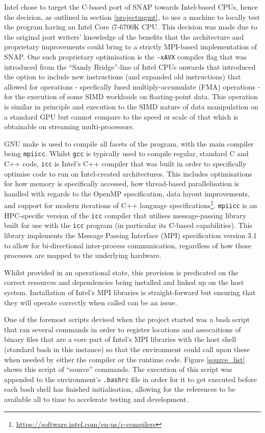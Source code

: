 \documentclass[conference]{IEEEtran}
\begin{document}
Intel chose to target the C-based port of SNAP towards Intel-based CPUs, hence the decision, as outlined in section \ref{projectmgmt}, to use a machine to locally test the program having an Intel Core i7-6700K CPU. This decision was made due to the original port writers' knowledge of the benefits that the architecture and proprietary improvements could bring to a strictly MPI-based implementation of SNAP. One such proprietary optimisation is the \texttt{-xAVX} compiler flag that was introduced from the ``Sandy Bridge''-line of Intel CPUs onwards that introduced the option to include new instructions (and expanded old instructions) that allowed for operations - specfically fused multiply-accumulate (FMA) operations - for the execution of some SIMD workloads on floating-point data\cite{KanterIntel}. This operation is similar in principle and execution to the SIMD nature of data manipulation on a standard GPU but cannot compare to the speed or scale of that which is obtainable on streaming multi-processors.

GNU make is used to compile all facets of the program, with the main compiler being \texttt{mpiicc}. Whilst \texttt{gcc} is typically used to compile regular, standard C and C++ code, \texttt{icc} is Intel's C++ compiler that was built in order to specifically optimise code to run on Intel-created architectures. This includes optimisations for how memory is specifically accessed, how thread-based parallelisation is handled with regards to the OpenMP specification, data layout improvements, and support for modern iterations of C++ language specifications\footnote{\url{https://software.intel.com/en-us/c-compilers}}. \texttt{mpiicc} is an HPC-specific version of the \texttt{icc} compiler that utilises message-passing library built for use with the \texttt{icc} program (in particular its C-based capabilities). This library implements the Message Passing Interface (MPI) specification version 3.1\cite{intel-mpi-ref} to allow for bi-directional inter-process communication, regardless of how those processes are mapped to the underlying hardware.

Whilst provided in an operational state, this provision is predicated on the correct resources and dependencies being installed and linked up on the host system. Installation of Intel's MPI libraries is straight-forward but ensuring that they will operate correctly when called can be an issue.

One of the foremost scripts devised when the project started was a bash script that ran several commands in order to register locations and assocaitions of binary files that are a core part of Intel's MPI libraries with the host shell (standard bash in this instance) so that the environment could call upon these when needed by either the compiler or the runtime code. Figure \ref{source_list} shows this script of ``source'' commands. The execution of this script was appended to the environment's \texttt{.bashrc} file in order for it to get executed before each bash shell has finished initialisation, allowing for the references to be available all to time to accelerate testing and development.
\end{document}
